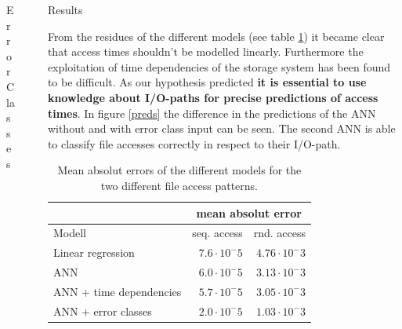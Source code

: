 \documentclass[final]{beamer}
\newlength{\sepwid}
\newlength{\onecolwid}
\begin{document}
\begin{frame}[t]
\begin{columns}[t]
\begin{column}{\onecolwid}
\begin{block}{Error Classes}

\end{block}

\end{column} %

\begin{column}{\sepwid}\end{column} %

\begin{column}{\onecolwid} %

\begin{block}{Results}
	
	From the residues of the different models (see table \ref{residues}) it became clear that access times shouldn't be modelled linearly.
	Furthermore the exploitation of time dependencies of the storage system has been found to be difficult.
	As our hypothesis predicted \textbf{it is essential to use knowledge about I/O-paths for precise predictions of access times}.
	In figure \ref{preds} the difference in the predictions of the ANN without and with error class input can be seen.
	The second ANN is able to classify file accesses correctly in respect to their I/O-path.
	
	
	\begin{table}
		\vspace{2ex}
		\begin{tabular}{l|r|r}%
			&  \multicolumn{2}{|c}{mean absolut error}\\ \hline
			Modell & seq. access & rnd. access\\ \hline
			Linear regression & $7.6\cdot 10^-5$ & $4.76\cdot 10^-3$ \\
			ANN & $6.0\cdot 10^-5$ & $3.13\cdot 10^-3$ \\
			ANN + time dependencies & $5.7\cdot 10^-5$ & $3.05\cdot 10^-3$\\
			ANN + error classes & $2.0\cdot 10^-5$ & $1.03\cdot 10^-3$ \\
		\end{tabular}
		\caption{Mean absolut errors of the different models for the two different file access patterns.}
		\label{residues}
	\end{table}
	

\end{block}
\end{column}
\end{columns}
\end{frame}
\end{document}
